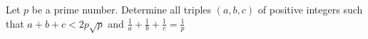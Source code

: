 Let $p$ be a prime number. Determine all triples $(a,b,c)$ of positive integers such that $a + b + c < 2p\sqrt{p}$ and
$\frac{1}{a}+\frac{1}{b}+\frac{1}{c}=\frac{1}{p}$